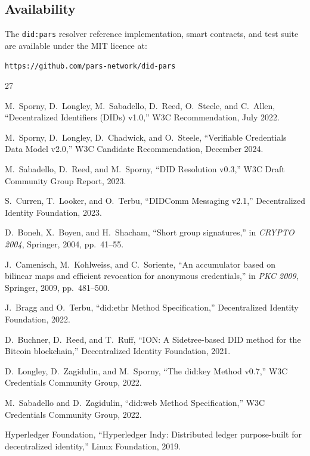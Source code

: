 \documentclass[11pt,a4paper]{article}
\begin{document}
\subsection{Availability}

The \texttt{did:pars} resolver reference implementation, smart contracts, and test
suite are available under the MIT licence at:
\begin{center}
\texttt{https://github.com/pars-network/did-pars}
\end{center}



\begin{thebibliography}{27}

M.~Sporny, D.~Longley, M.~Sabadello, D.~Reed, O.~Steele, and C.~Allen,
``Decentralized Identifiers (DIDs) v1.0,''
W3C Recommendation, July 2022.

M.~Sporny, D.~Longley, D.~Chadwick, and O.~Steele,
``Verifiable Credentials Data Model v2.0,''
W3C Candidate Recommendation, December 2024.

M.~Sabadello, D.~Reed, and M.~Sporny,
``DID Resolution v0.3,''
W3C Draft Community Group Report, 2023.

S.~Curren, T.~Looker, and O.~Terbu,
``DIDComm Messaging v2.1,''
Decentralized Identity Foundation, 2023.

D.~Boneh, X.~Boyen, and H.~Shacham,
``Short group signatures,''
in \emph{CRYPTO 2004}, Springer, 2004, pp.~41--55.

J.~Camenisch, M.~Kohlweiss, and C.~Soriente,
``An accumulator based on bilinear maps and efficient revocation for anonymous credentials,''
in \emph{PKC 2009}, Springer, 2009, pp.~481--500.

J.~Bragg and O.~Terbu,
``did:ethr Method Specification,''
Decentralized Identity Foundation, 2022.

D.~Buchner, D.~Reed, and T.~Ruff,
``ION: A Sidetree-based DID method for the Bitcoin blockchain,''
Decentralized Identity Foundation, 2021.

D.~Longley, D.~Zagidulin, and M.~Sporny,
``The did:key Method v0.7,''
W3C Credentials Community Group, 2022.

M.~Sabadello and D.~Zagidulin,
``did:web Method Specification,''
W3C Credentials Community Group, 2022.

Hyperledger Foundation,
``Hyperledger Indy: Distributed ledger purpose-built for decentralized identity,''
Linux Foundation, 2019.


\end{thebibliography}
\end{document}
